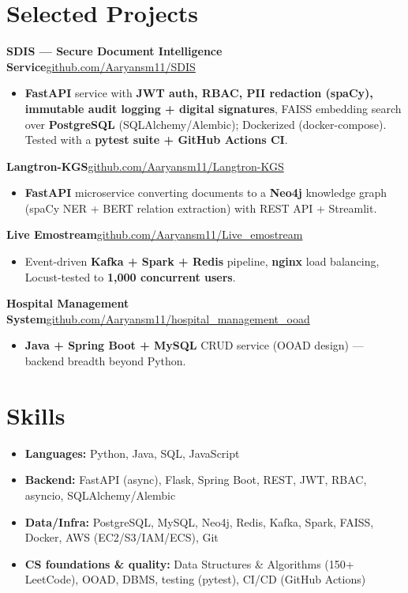 \documentclass[10pt,a4paper]{article}
\begin{document}
\section*{Selected Projects}
\vspace{1pt}\textbf{SDIS --- Secure Document Intelligence Service}\hfill {\small\href{https://github.com/Aaryansm11/SDIS}{github.com/Aaryansm11/SDIS}}
\begin{itemize}
\item \textbf{FastAPI} service with \textbf{JWT auth, RBAC, PII redaction (spaCy), immutable audit logging + digital signatures}, FAISS embedding search over \textbf{PostgreSQL} (SQLAlchemy/Alembic); Dockerized (docker-compose). Tested with a \textbf{pytest suite + GitHub Actions CI}.
\end{itemize}
\vspace{1pt}\textbf{Langtron-KGS}\hfill {\small\href{https://github.com/Aaryansm11/Langtron-KGS}{github.com/Aaryansm11/Langtron-KGS}}
\begin{itemize}
\item \textbf{FastAPI} microservice converting documents to a \textbf{Neo4j} knowledge graph (spaCy NER + BERT relation extraction) with REST API + Streamlit.
\end{itemize}
\vspace{1pt}\textbf{Live Emostream}\hfill {\small\href{https://github.com/Aaryansm11/Live_emostream}{github.com/Aaryansm11/Live\_emostream}}
\begin{itemize}
\item Event-driven \textbf{Kafka + Spark + Redis} pipeline, \textbf{nginx} load balancing, Locust-tested to \textbf{1,000 concurrent users}.
\end{itemize}
\vspace{1pt}\textbf{Hospital Management System}\hfill {\small\href{https://github.com/Aaryansm11/hospital_management_ooad}{github.com/Aaryansm11/hospital\_management\_ooad}}
\begin{itemize}
\item \textbf{Java + Spring Boot + MySQL} CRUD service (OOAD design) --- backend breadth beyond Python.
\end{itemize}
\section*{Skills}
\begin{itemize}
\item \textbf{Languages:} Python, Java, SQL, JavaScript
\item \textbf{Backend:} FastAPI (async), Flask, Spring Boot, REST, JWT, RBAC, asyncio, SQLAlchemy/Alembic
\item \textbf{Data/Infra:} PostgreSQL, MySQL, Neo4j, Redis, Kafka, Spark, FAISS, Docker, AWS (EC2/S3/IAM/ECS), Git
\item \textbf{CS foundations \& quality:} Data Structures \& Algorithms (150+ LeetCode), OOAD, DBMS, testing (pytest), CI/CD (GitHub Actions)
\end{itemize}
\end{document}

